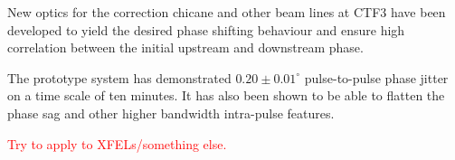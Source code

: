 \documentclass[%
 reprint,
 amsmath,amssymb,
 prl,
]{revtex4-1}
\begin{document}
New optics for the correction chicane and other beam lines at CTF3 have been 
developed to yield the desired phase shifting behaviour and ensure high 
correlation between the initial upstream and downstream phase.

The prototype system has demonstrated \(0.20\pm0.01^\circ\) pulse-to-pulse 
phase jitter on a time scale of ten minutes. It has also been shown to be able 
to flatten the phase sag and other higher bandwidth intra-pulse features.


\textcolor{red}{Try to apply to XFELs/something else.}

\end{document}
